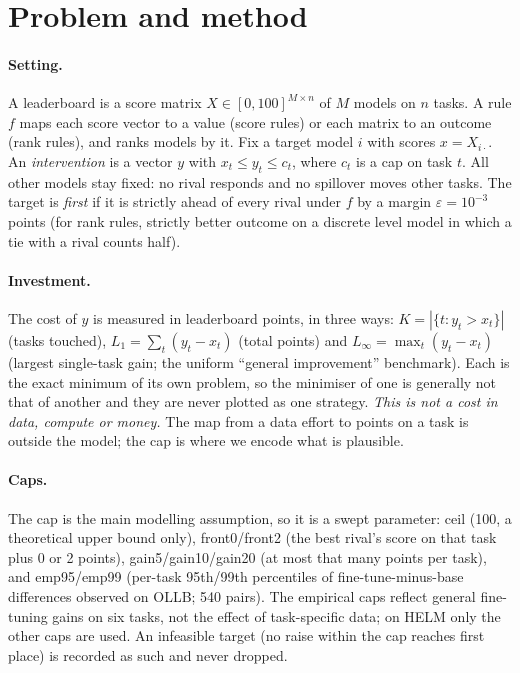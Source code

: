 \section{Problem and method}\label{sec:method}
\paragraph{Setting.}
A leaderboard is a score matrix $X\in[0,100]^{M\times n}$ of $M$ models on $n$ tasks. A rule $f$ maps each score vector to a value (score rules) or each matrix to an outcome (rank rules), and ranks models by it. Fix a target model $i$ with scores $x=X_{i\cdot}$. An \emph{intervention} is a vector $y$ with $x_t\le y_t\le c_t$, where $c_t$ is a cap on task $t$. All other models stay fixed: no rival responds and no spillover moves other tasks. The target is \emph{first} if it is strictly ahead of every rival under $f$ by a margin $\varepsilon=10^{-3}$ points (for rank rules, strictly better outcome on a discrete level model in which a tie with a rival counts half).

\paragraph{Investment.}
The cost of $y$ is measured in leaderboard points, in three ways:
$K=|\{t:y_t>x_t\}|$ (tasks touched), $L_1=\sum_t(y_t-x_t)$ (total points) and $L_\infty=\max_t(y_t-x_t)$ (largest single-task gain; the uniform ``general improvement'' benchmark).
Each is the exact minimum of its own problem, so the minimiser of one is generally not that of another and they are never plotted as one strategy.
\emph{This is not a cost in data, compute or money.} The map from a data effort to points on a task is outside the model; the cap is where we encode what is plausible.

\paragraph{Caps.}
The cap is the main modelling assumption, so it is a swept parameter: \textsf{ceil} (100, a theoretical upper bound only), \textsf{front0}/\textsf{front2} (the best rival's score on that task plus 0 or 2 points), \textsf{gain5}/\textsf{gain10}/\textsf{gain20} (at most that many points per task), and \textsf{emp95}/\textsf{emp99} (per-task 95th/99th percentiles of fine-tune-minus-base differences observed on OLLB; 540 pairs). The empirical caps reflect general fine-tuning gains on six tasks, not the effect of task-specific data; on HELM only the other caps are used. An infeasible target (no raise within the cap reaches first place) is recorded as such and never dropped.

